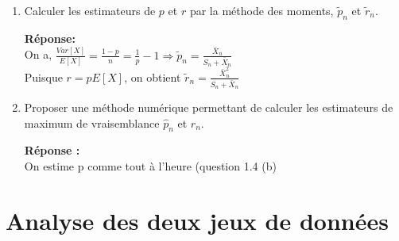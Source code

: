 \documentclass[12pt]{article}
\newcommand{\dsp}{\displaystyle}
\begin{document}
\begin{enumerate}
\item Calculer les estimateurs de $p$ et $r$ par la méthode des moments, $\tilde{p}_n$ et $\tilde{r}_n$.

\textbf{Réponse:\\}
On a, $ \dsp \frac{Var[X]}{E[X]} = \frac{1-p}{n} = \frac{1}{p} - 1 \Rightarrow \tilde{p}_n = \frac{\bar{X}_n}{S_n+\bar{X}_n} $ \\
Puisque $ r= p E[X]$, on obtient $\dsp \tilde{r}_n = \frac{ \bar{X}_n^2}{S_n + \bar{X}_n} $
\vspace{3mm}

\item Proposer une méthode numérique permettant de calculer les estimateurs de maximum de vraisemblance $\hat{p}_n$ et $\hat{r}_n$.

\textbf{Réponse :\\}
On estime p comme tout à l'heure (question 1.4 (b)
\end{enumerate}


\section{Analyse des deux jeux de données}
\end{document}
